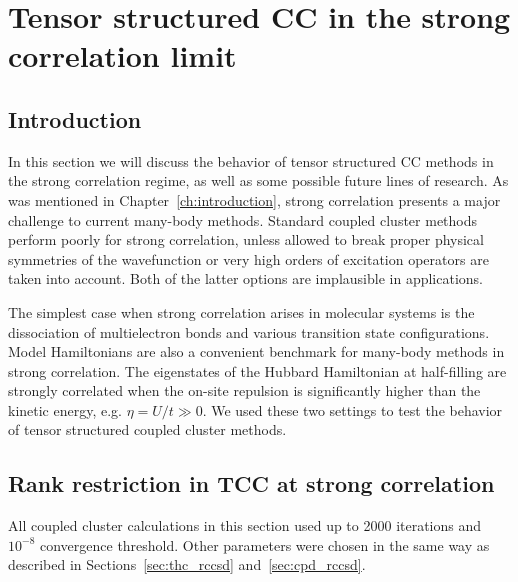 \section{Tensor structured CC in the strong correlation limit
\label{sec:strong_correlation}}
\subsection{Introduction}
In this section we will discuss the behavior of tensor structured CC methods 
in the strong correlation regime, as well as some possible future lines of 
research. As was mentioned in Chapter~\ref{ch:introduction}, strong correlation 
presents a major challenge to current many-body methods. Standard 
coupled cluster methods perform poorly for strong correlation, unless allowed 
to break proper physical symmetries of the wavefunction or very high orders of 
excitation operators are taken into account. Both of the latter options are 
implausible in applications.

The simplest case when strong correlation arises in molecular systems is the 
dissociation of multielectron bonds and various transition state 
configurations. Model Hamiltonians are also a convenient benchmark for 
many-body methods in strong correlation. The eigenstates of the Hubbard 
Hamiltonian at half-filling are strongly correlated when the on-site repulsion 
is significantly higher than the kinetic energy, e.g. $\eta = U / t \gg 0$. We 
used these two settings to test the behavior of tensor structured coupled 
cluster methods.

\subsection{Rank restriction in TCC at strong correlation}
All coupled cluster calculations in this section used up to 2000 iterations and 
$10^{-8}$ convergence threshold. Other parameters were chosen in the same 
way as described in Sections~\ref{sec:thc_rccsd} and~\ref{sec:cpd_rccsd}. 

